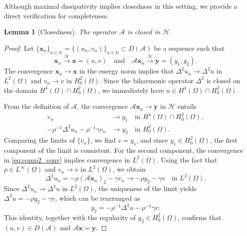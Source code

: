 \documentclass[12pt,reqno]{amsart}
\newtheorem{lemm}[theo]{Lemma}
\numberwithin{equation}{section}
\begin{document}
	
	Although maximal dissipativity implies closedness in this setting, we provide a direct verification for completeness.
	
	\begin{lemm}[Closedness] \label{lemm3}
		The operator \( \mathcal{A} \) is closed in \( \mathcal{H} \).
	\end{lemm}
	
	\begin{proof}
		Let \( \{\mathbf{x}_n\}_{n\in\mathbb{N}} = \{(u_n, v_n)\}_{n\in\mathbb{N}} \subset D(\mathcal{A}) \) be a sequence such that 
		\begin{equation*}\label{eq:conv_sequences}
			\mathbf{x}_n \xrightarrow{\mathcal{H}} \mathbf{x} = (u, v) \quad \text{and} \quad \mathcal{A}\mathbf{x}_n \xrightarrow{\mathcal{H}} \mathbf{y} = (y_1, y_2).
		\end{equation*}
		The convergence $\mathbf{x}_n \to \mathbf{x}$ in the energy norm implies that $\Delta^2 u_n \to \Delta^2 u$ in $L^2(\Omega)$ and $v_n \to v$ in $H_0^2(\Omega)$. Since the biharmonic operator $\Delta^2$ is closed on the domain $H^4(\Omega) \cap H_0^2(\Omega)$, we immediately have $u \in H^4(\Omega) \cap H_0^2(\Omega)$.
		
		From the definition of $\mathcal{A}$, the convergence $\mathcal{A}\mathbf{x}_n \to \mathbf{y}$ in $\mathcal{H}$ entails
		\begin{align}
			v_n &\to y_1 \quad \text{in } H^4(\Omega) \cap H_0^2(\Omega), \label{eq:v_n_conv_H4} \\
			-\rho^{-1} \Delta^2 u_n - \rho^{-1} \gamma v_n &\to y_2 \quad \text{in } H_0^2(\Omega). \label{eq:comp2_conv}
		\end{align}
		Comparing the limits of $\{v_n\}$, we find $v = y_1$, and since $y_1 \in H_0^2(\Omega)$, the first component of the limit is consistent. For the second component, the convergence in \eqref{eq:comp2_conv} implies convergence in $L^2(\Omega)$. Using the fact that $\rho \in L^\infty(\Omega)$ and $v_n \to v$ in $L^2(\Omega)$, we obtain
		\[
		\Delta^2 u_n = -\rho (\mathcal{A}\mathbf{x}_n)_2 - \gamma v_n \to -\rho y_2 - \gamma v \quad \text{in } L^2(\Omega).
		\]
		Since $\Delta^2 u_n \to \Delta^2 u$ in $L^2(\Omega)$, the uniqueness of the limit yields $\Delta^2 u = -\rho y_2 - \gamma v$, which can be rearranged as
		\[
		y_2 = -\rho^{-1} \Delta^2 u - \rho^{-1} \gamma v.
		\]
		This identity, together with the regularity of $y_2 \in H_0^2(\Omega)$, confirms that $(u, v) \in D(\mathcal{A})$ and $\mathcal{A}\mathbf{x} = \mathbf{y}$.
	\end{proof}
	
\end{document}
